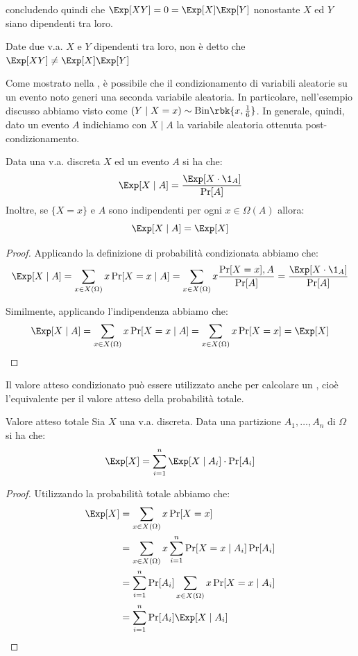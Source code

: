 \documentclass[a4paper, 12pt]{report}
\begin{document}
    concludendo quindi che $\Exp[XY] = 0 = \Exp[X] \Exp[Y]$ nonostante $X$ ed $Y$ siano dipendenti tra loro.

    \begin{framedobs}{}
        Date due v.a. $X$ e $Y$ dipendenti tra loro, non è detto che $\Exp[XY] \neq \Exp[X] \Exp[Y]$
    \end{framedobs}

    Come mostrato nella , è possibile che il condizionamento di variabili aleatorie su un evento noto generi una seconda variabile aleatoria. In particolare, nell'esempio discusso abbiamo visto come $(Y \mid X = x) \sim \mathrm{Bin}\rbk{x, \frac{1}{6}}$. In generale, quindi, dato un evento $A$ indichiamo con $X \mid A$ la variabile aleatoria ottenuta post-condizionamento.

    \begin{framedprop}{}
        Data una v.a. discreta $X$ ed un evento $A$ si ha che:
        \[\Exp[X \mid A] = \frac{\Exp[X \cdot \1_A]}{\Pr[A]}\]
        Inoltre, se $\{X = x\}$ e $A$ sono indipendenti per ogni $x \in \Omega(A)$ allora:
        \[\Exp[X \mid A] = \Exp[X]\]
    \end{framedprop}

    \begin{proof}
        Applicando la definizione di probabilità condizionata abbiamo che:
        \[\Exp[X \mid A] = \sum_{x \in X(\Omega)} x \Pr[X = x \mid A] = \sum_{x \in X(\Omega)} x \frac{\Pr[X = x], A}{\Pr[A]} = \frac{\Exp[X \cdot \1_A]}{\Pr[A]}\]

        Similmente, applicando l'indipendenza abbiamo che:
        \[\Exp[X \mid A] = \sum_{x \in X(\Omega)} x \Pr[X = x \mid A] = \sum_{x \in X(\Omega)} x \Pr[X = x] = \Exp[X]\]
    \end{proof}

    Il valore atteso condizionato può essere utilizzato anche per calcolare un , cioè l'equivalente per il valore atteso della probabilità totale.

    \begin{framedprop}{Valore atteso totale }
        Sia $X$ una v.a. discreta. Data una partizione $A_1, \ldots, A_n$ di $\Omega$ si ha che:
        \[\Exp[X] = \sum_{i = 1}^n \Exp[X \mid A_i] \cdot \Pr[A_i]\]
    \end{framedprop}
    
    \begin{proof}
        Utilizzando la probabilità totale abbiamo che:
        \[\begin{split}
            \Exp[X] &= \sum_{x \in X(\Omega)} x \Pr[X = x] \\
            &= \sum_{x \in X(\Omega)} x \sum_{i = 1}^n \Pr[X = x \mid A_i] \Pr[A_i] \\
            &= \sum_{i = 1}^n  \Pr[A_i] \sum_{x \in X(\Omega)} x \Pr[X = x \mid A_i]  \\
            &= \sum_{i = 1}^n  \Pr[A_i] \Exp[X \mid A_i]  \\
        \end{split}\]
    \end{proof}
\end{document}

